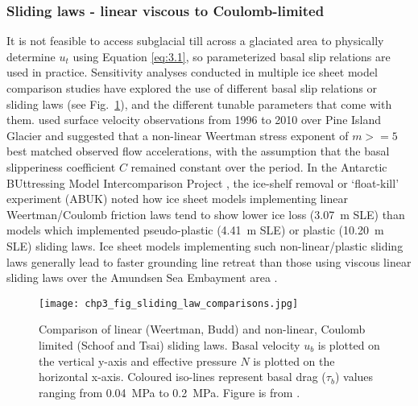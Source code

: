 \subsubsection{Sliding laws - linear viscous to Coulomb-limited}


It is not feasible to access subglacial till across a glaciated area to physically determine $u_t$ using Equation \eqref{eq:3.1}, so parameterized basal slip relations are used in practice.
Sensitivity analyses conducted in multiple ice sheet model comparison studies \citep[e.g.][]{SeroussiinitMIPAntarcticaicesheet2019,SunAntarcticicesheet2020,ZhangcomparisontwoStokes2017} have explored the use of different basal slip relations or sliding laws (see Fig.~\ref{fig:sliding_laws}), and the different tunable parameters that come with them.
\citet{Gillet-ChauletAssimilationsurfacevelocities2016} used surface velocity observations from 1996 to 2010 over Pine Island Glacier and suggested that a non-linear Weertman stress exponent of $m >= 5$ best matched observed flow accelerations, with the assumption that the basal slipperiness coefficient $C$ remained constant over the period.
In the Antarctic BUttressing Model Intercomparison Project \citep[ABUMIP;][]{SunAntarcticicesheet2020}, the ice-shelf removal or `float-kill' experiment (ABUK) noted how ice sheet models implementing linear Weertman/Coulomb friction laws tend to show lower ice loss (\SI{3.07}{\metre} \gls{SLE}) than models which implemented pseudo-plastic (\SI{4.41}{\metre} \gls{SLE}) or plastic (\SI{10.20}{\metre} \gls{SLE}) sliding laws.
Ice sheet models implementing such non-linear/plastic sliding laws generally lead to faster grounding line retreat than those using viscous linear sliding laws over the Amundsen Sea Embayment area \citep[e.g.][]{JoughinBasalconditionsPine2009,RitzPotentialsealevelrise2015,BrondexSensitivitygroundingline2017,BulthuisUncertaintyquantificationmulticentennial2019}.

\begin{figure}[htbp]
  \texttt{[image: chp3\_fig\_sliding\_law\_comparisons.jpg]}
  \caption[Comparison of Weertman, Budd, Schoof and Tsai sliding laws]{
    Comparison of linear (Weertman, Budd) and non-linear, Coulomb limited (Schoof and Tsai) sliding laws.
    Basal velocity $u_b$ is plotted on the vertical y-axis and effective pressure $N$ is plotted on the horizontal x-axis.
    Coloured iso-lines represent basal drag ($\tau_b$) values ranging from \SI{0.04}{\mega\pascal} to \SI{0.2}{\mega\pascal}.
    Figure is from \citet{BrondexSensitivitygroundingline2017}.
  }
  \label{fig:sliding_laws}
\end{figure}

